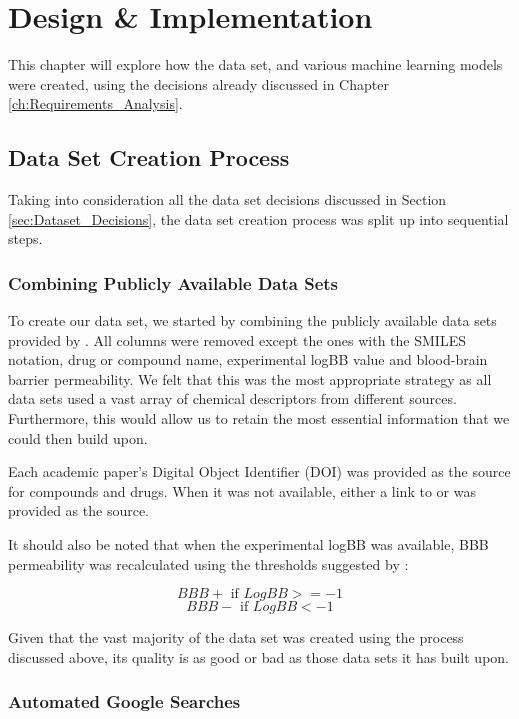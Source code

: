 \chapter{Design \& Implementation}

This chapter will explore how the data set, and various machine learning models were created, using the decisions already discussed in Chapter \ref{ch:Requirements_Analysis}.

\section{Data Set Creation Process}

Taking into consideration all the data set decisions discussed in Section \ref{sec:Dataset_Decisions}, the data set creation process was split up into sequential steps.

\subsection{Combining Publicly Available Data Sets}

To create our data set, we started by combining the publicly available data sets provided by \citet{Singh2020, Zhang2008, Gao2017, Zhang2008}. All columns were removed except the ones with the SMILES notation, drug or compound name, experimental logBB value and blood-brain barrier permeability. We felt that this was the most appropriate strategy as all data sets used a vast array of chemical descriptors from different sources. Furthermore, this would allow us to retain the most essential information that we could then build upon.

Each academic paper's Digital Object Identifier (DOI) was provided as the source for compounds and drugs. When it was not available, either a link to \citet{PubMed} or \citet{PubMed_Central} was provided as the source.

It should also be noted that when the experimental logBB was available, BBB permeability was recalculated using the thresholds suggested by \citet{Li2005}:

$$ BBB+ \text{ if } LogBB >= -1 $$
$$ BBB- \text{ if } LogBB < -1  $$

Given that the vast majority of the data set was created using the process discussed above, its quality is as good or bad as those data sets it has built upon.

\subsection{Automated Google Searches}

